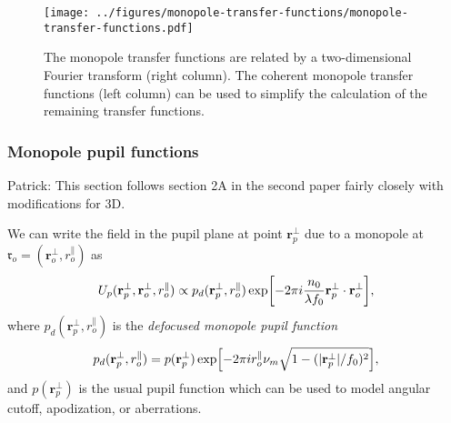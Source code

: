 \documentclass[]{osa-article}
\let\originalleft\left
\let\originalright\right
\renewcommand{\left}{\mathopen{}\mathclose\bgroup\originalleft}
\renewcommand{\right}{\aftergroup\egroup\originalright}
\providecommand{\ro}{\boldsymbol{\mathfrak{r}}_o}
\providecommand{\rs}{\boldsymbol{\mathfrak{r}}_s}
\newcommand{\mypar}{\parallel}
\providecommand{\ropar}{r_o^{\mypar}}
\providecommand{\roperp}{\mathbf{r}_o^{\bot}}
\providecommand{\rspar}{r_s^{\mypar}}
\providecommand{\rsperp}{\mathbf{r}_s^{\bot}}
\providecommand{\rppar}{r_p^{\mypar}}
\providecommand{\rpperp}{\mathbf{r}_p^{\bot}}
\providecommand{\add}[1]{{\color{blue}#1}}
\begin{document}
\begin{figure}
  \centering
\texttt{[image: ../figures/monopole-transfer-functions/monopole-transfer-functions.pdf]}
  \caption{
    The monopole transfer functions are related by a two-dimensional Fourier transform (right column). The coherent monopole transfer functions (left column) can be used to simplify the calculation of the remaining transfer functions.
  }
  \label{fig:monopole-transfer-functions}
\end{figure}

\subsubsection{Monopole pupil functions}
\add{Patrick: This section follows section 2A in the second paper \cite{chandler2019b} fairly closely with modifications for 3D.}

We can write the field in the pupil plane at point $\rpperp$ due to a monopole at $\ro = (\roperp, \ropar)$ as
\begin{align}
  U_p(\rpperp, \roperp, \ropar) \propto p_d(\rpperp, \ropar)\,\text{exp}\left[-2\pi i \frac{n_0}{\lambda f_0}\rpperp\cdot\roperp\right],
\end{align}
where $p_d(\rpperp, \ropar)$ is the \textit{defocused monopole pupil function}  
\begin{align}
  p_d(\rpperp, \ropar) = p(\rpperp)\, \text{exp}\left[-2\pi i\ropar\nu_m\sqrt{1 - (|\rpperp|/f_0)^2}\right],
\end{align}
and $p(\rpperp)$ is the usual pupil function which can be used to model angular cutoff, apodization, or aberrations.
\end{document}
